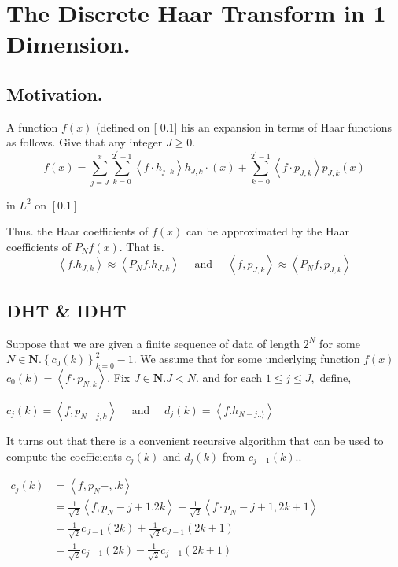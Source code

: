 \section{The Discrete Haar Transform in 1 Dimension.}

\subsection{Motivation.}
A function $f(x)$ (defined on [ 0.1] his an expansion in terms of
Haar functions as follows. Give that any integer $J \geq 0$.
$$
f(x)=\sum_{j=J}^{x} \sum_{k=0}^{2^{\prime}-1}\left\langle f \cdot h_{j \cdot k}\right\rangle h_{J, k} \cdot(x)+\sum_{k=0}^{2^{\prime}-1}\left\langle f \cdot p_{J, k}\right\rangle p_{J, k}(x)
$$

in $L^{2}$ on $[0.1]$

Thus. the Haar coefficients of $f(x)$ can be approximated by the Haar coefficients of $P_{N} f(x)$. That is.
$$
\left\langle f . h_{J,k}\right\rangle \approx\left\langle P_{N} f . h_{J,k}\right\rangle \quad \text { and } \quad\left\langle f, p_{J,k}\right\rangle \approx\left\langle P_{N} f, p_{J,k}\right\rangle
$$

\subsection{DHT \& IDHT}

\begin{definition}
Suppose that we are given a finite sequence of data of length $2^{N}$ for some
$N \in \mathbf{N} .\left\{c_{0}(k)\right\}_{k=0}^{2}-1$. We assume that for some underlying function $f(x)$
$c_{0}(k)=\left\langle f \cdot p_{N, k}\right\rangle .$ Fix $J \in \mathbf{N} . J<N .$ and for each $1 \leq j \leq J,$ define,

$c_{j}(k)=\left\langle f, p_{N-j, k}\right\rangle \quad$ and $\quad d_{j}(k)=\left\langle f . h_{N-j . .\rangle}\right\rangle$

\end{definition}

It turns out that there is a convenient recursive algorithm that can be used to compute the coefficients $c_{j}(k)$ and $d_{j}(k)$ from $c_{j-1}(k) .$.

$\begin{aligned} c_{j}(k) &=\left\langle f, p_{N}-, . k\right\rangle \\ &=\frac{1}{\sqrt{2}}\left\langle f, p_{N}-j+1.2 k\right\rangle+\frac{1}{\sqrt{2}}\left\langle f \cdot p_{N}-j+1,2 k+1\right\rangle \\ &=\frac{1}{\sqrt{2}} c_{J-1}(2 k)+\frac{1}{\sqrt{2}} c_{J-1}(2 k+1) \\ &=\frac{1}{\sqrt{2}} c_{j-1}(2 k)-\frac{1}{\sqrt{2}} c_{j-1}(2 k+1) \end{aligned}$

